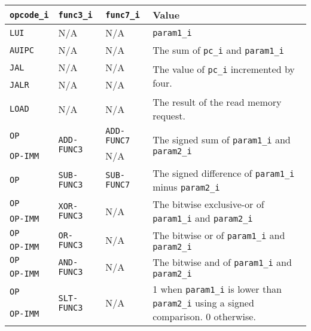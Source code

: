 {
\footnotesize
\begin{tabularx}{0.9\textwidth}{|l|l|l|X|}
  \hline
  \cellcolor{gray!20}\textbf{\texttt{opcode\_i}} & \cellcolor{gray!20}\textbf{\texttt{func3\_i}} & \cellcolor{gray!20}\textbf{\texttt{func7\_i}} & \cellcolor{gray!20}\textbf{Value} \\
  \hline
  \texttt{LUI} & N/A & N/A & \texttt{param1\_i} \\
  \hline
  \texttt{AUIPC} & N/A & N/A & The sum of \texttt{pc\_i} and \texttt{param1\_i} \\
  \hline
  \texttt{JAL} & N/A & N/A & \multirow{2}{*}{The value of \texttt{pc\_i} incremented by four.} \\
  \cline{1-3}
  \texttt{JALR} & N/A & N/A & \\
  \hline
  \texttt{LOAD} & N/A & N/A & The result of the read memory request. \\
  \hline
  \texttt{OP} & \multirow{2}{*}{\texttt{ADD-FUNC3}} & \texttt{ADD-FUNC7} & \multirow{2}{*}{The signed sum of \texttt{param1\_i} and \texttt{param2\_i}} \\
  \cline{1-1}\cline{3-3}
  \texttt{OP-IMM} &  & N/A & \\
  \hline
  \texttt{OP} & \texttt{SUB-FUNC3} & \texttt{SUB-FUNC7} & The signed difference of \texttt{param1\_i} minus \texttt{param2\_i} \\
  \hline
  \texttt{OP} & \multirow{2}{*}{\texttt{XOR-FUNC3}} & \multirow{2}{*}{N/A} & \multirow{2}{*}{The bitwise exclusive-or of \texttt{param1\_i} and \texttt{param2\_i}} \\
  \cline{1-1}
  \texttt{OP-IMM} &  &  & \\
  \hline
  \texttt{OP} & \multirow{2}{*}{\texttt{OR-FUNC3}} & \multirow{2}{*}{N/A} & \multirow{2}{*}{The bitwise or of \texttt{param1\_i} and \texttt{param2\_i}} \\
  \cline{1-1}
  \texttt{OP-IMM} &  &  & \\
  \hline
  \texttt{OP} & \multirow{2}{*}{\texttt{AND-FUNC3}} & \multirow{2}{*}{N/A} & \multirow{2}{*}{The bitwise and of \texttt{param1\_i} and \texttt{param2\_i}} \\
  \cline{1-1}
  \texttt{OP-IMM} &  &  & \\
  \hline
  \texttt{OP} & \multirow{2}{*}{\texttt{SLT-FUNC3}} & \multirow{2}{*}{N/A} & \multirow{2}{0.46\textwidth}{1 when \texttt{param1\_i} is lower than \texttt{param2\_i} using a signed comparison. 0 otherwise.} \\
  \cline{1-1}
  \texttt{OP-IMM} &  &  & \\

\end{tabularx}}
